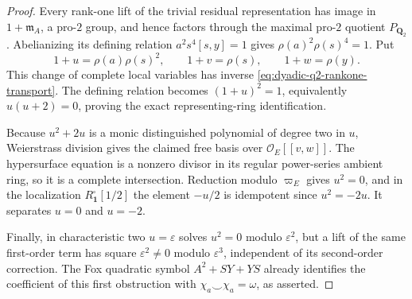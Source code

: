 \documentclass[11pt]{article}
\theoremstyle{definition}
\begin{document}
\begin{proof}
Every rank-one lift of the trivial
residual representation has image
in $1+\mathfrak m_A$, a pro-$2$
group, and hence factors through
the maximal pro-$2$ quotient
$P_{\mathbf Q_2}$.
Abelianizing its defining relation
$a^2s^4[s,y]=1$ gives
$\rho(a)^2\rho(s)^4=1$.
Put
\[
1+u=\rho(a)\rho(s)^2,\qquad
1+v=\rho(s),\qquad
1+w=\rho(y).
\]
This change of complete local
variables has inverse
\eqref{eq:dyadic-q2-rankone-transport}.
The defining relation becomes
$(1+u)^2=1$, equivalently
$u(u+2)=0$, proving the exact
representing-ring identification.

Because $u^2+2u$ is a monic
distinguished polynomial of degree
two in $u$, Weierstrass division
gives the claimed free basis over
$\mathcal O_E[[v,w]]$.
The hypersurface equation is a
nonzero divisor in its regular
power-series ambient ring, so it
is a complete intersection.
Reduction modulo $\varpi_E$ gives
$u^2=0$, and in the localization
$R_{\mathbf1}^{\square}[1/2]$
the element $-u/2$ is idempotent
since $u^2=-2u$.
It separates $u=0$ and $u=-2$.

Finally, in characteristic two
$u=\varepsilon$ solves $u^2=0$
modulo $\varepsilon^2$, but a
lift of the same first-order term
has square $\varepsilon^2\ne0$
modulo $\varepsilon^3$, independent
of its second-order correction.
The Fox quadratic symbol
$A^2+SY+YS$ already identifies
the coefficient of this first
obstruction with
$\chi_a\smile\chi_a=\omega$,
as asserted.
\end{proof}
\end{document}
